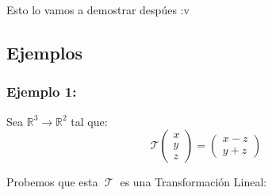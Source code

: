 \documentclass[12pt, fleqn]{report}                             %
\theoremstyle{break}                                            %
\DeclareMathOperator \LinTrans      {\mathcal{T}}               %
\newcommand{\VecLinTrans}[1]{\mathcal{T}\pVector{#1}}           %
\newcommand{\pVector}[1]                                        %
        { \ensuremath{\begin{pmatrix}#1\end{pmatrix}} }             %
\begin{document}
                Esto lo vamos a demostrar despúes :v




            \clearpage
            \subsection{Ejemplos}

                \subsubsection{Ejemplo 1:}
                    Sea $\mathbb{R}^3 \to \mathbb{R}^2$ tal que:
                    \begin{equation*}
                        \VecLinTrans{x\\y\\z}  = \pVector{x-z\\y+z}
                    \end{equation*}

                    Probemos que esta $\LinTrans$ es una Transformación Lineal:
\end{document}
